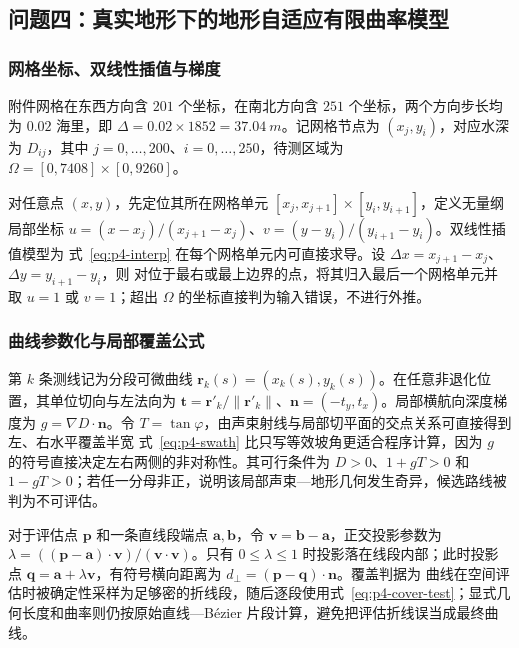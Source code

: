 \subsection{问题四：真实地形下的地形自适应有限曲率模型}
\subsubsection{网格坐标、双线性插值与梯度}
附件网格在东西方向含 $201$ 个坐标，在南北方向含 $251$ 个坐标，两个方向步长均为 $0.02$ 海里，即 $\Delta=0.02\times1852=\SI{37.04}{m}$。记网格节点为 $(x_j,y_i)$，对应水深为 $D_{ij}$，其中 $j=0,\ldots,200$、$i=0,\ldots,250$，待测区域为 $\Omega=[0,7408]\times[0,9260]$。

对任意点 $(x,y)$，先定位其所在网格单元 $[x_j,x_{j+1}]\times[y_i,y_{i+1}]$，定义无量纲局部坐标 $u=(x-x_j)/(x_{j+1}-x_j)$、$v=(y-y_i)/(y_{i+1}-y_i)$。双线性插值模型为
式~\eqref{eq:p4-interp} 在每个网格单元内可直接求导。设 $\Delta x=x_{j+1}-x_j$、$\Delta y=y_{i+1}-y_i$，则
对位于最右或最上边界的点，将其归入最后一个网格单元并取 $u=1$ 或 $v=1$；超出 $\Omega$ 的坐标直接判为输入错误，不进行外推。

\subsubsection{曲线参数化与局部覆盖公式}
第 $k$ 条测线记为分段可微曲线 $\bm r_k(s)=(x_k(s),y_k(s))$。在任意非退化位置，其单位切向与左法向为 $\bm t=\bm r'_k/\|\bm r'_k\|$、$\bm n=(-t_y,t_x)$。局部横航向深度梯度为 $g=\nabla D\cdot\bm n$。令 $T=\tan\varphi$，由声束射线与局部切平面的交点关系可直接得到左、右水平覆盖半宽
式~\eqref{eq:p4-swath} 比只写等效坡角更适合程序计算，因为 $g$ 的符号直接决定左右两侧的非对称性。其可行条件为 $D>0$、$1+gT>0$ 和 $1-gT>0$；若任一分母非正，说明该局部声束—地形几何发生奇异，候选路线被判为不可评估。

对于评估点 $\bm p$ 和一条直线段端点 $\bm a,\bm b$，令 $\bm v=\bm b-\bm a$，正交投影参数为 $\lambda=((\bm p-\bm a)\cdot\bm v)/(\bm v\cdot\bm v)$。只有 $0\le\lambda\le1$ 时投影落在线段内部；此时投影点 $\bm q=\bm a+\lambda\bm v$，有符号横向距离为 $d_\perp=(\bm p-\bm q)\cdot\bm n$。覆盖判据为
曲线在空间评估时被确定性采样为足够密的折线段，随后逐段使用式~\eqref{eq:p4-cover-test}；显式几何长度和曲率则仍按原始直线—Bézier 片段计算，避免把评估折线误当成最终曲线。

